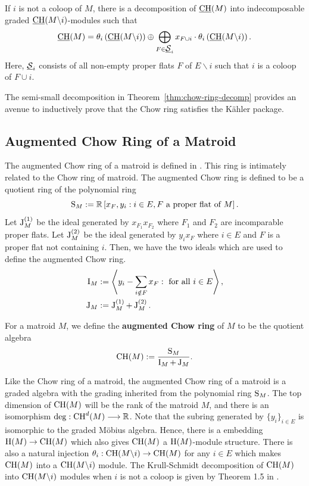 \documentclass{puthesis-UG}
\begin{document}
\begin{thm}  \label{thm:chow-ring-decomp}
	If $i$ is not a coloop of $M$, there is a decomposition of $\underbar{$\operatorname{CH}$}(M)$ into indecomposable graded $\underbar{$\operatorname{CH}$}(M \backslash i)$-modules such that 
	\[
		\underbar{$\operatorname{CH}$}(M) = \theta_i \left ( \underbar{$\operatorname{CH}$} (M \backslash i) \right ) \oplus \bigoplus_{F \in \underbar{$\mathcal{S}$}_i} x_{F \cup i} \cdot \theta_i \left ( \underbar{$\operatorname{CH}$} (M \backslash i) \right ).
	\]
	Here, $\underbar{$\mathcal{S}$}_i$ consists of all non-empty proper flats $F$ of $E \backslash i$ such that $i$ is a coloop of $F \cup i$. 
\end{thm}

The semi-small decomposition in Theorem~\ref{thm:chow-ring-decomp} provides an avenue to inductively prove that the Chow ring satisfies the K\"ahler package. 

\subsection{Augmented Chow Ring of a Matroid}

The augmented Chow ring of a matroid is defined in \cite{huh-semi-small}. This ring is intimately related to the Chow ring of matroid. The augmented Chow ring is defined to be a quotient ring of the polynomial ring
\[
	\operatorname{S}_M := \mathbb{R} \left [x_F, y_i : i \in E, F \text{ a proper flat of } M \right ].
\]
Let $\operatorname{J}_M^{(1)}$ be the ideal generated by $x_{F_1} x_{F_2}$ where $F_1$ and $F_2$ are incomparable proper flats. Let $\operatorname{J}_M^{(2)}$ be the ideal generated by $y_i x_F$ where $i \in E$ and $F$ is a proper flat not containing $i$. Then, we have the two ideals which are used to define the augmented Chow ring. 
\begin{align*}
	\operatorname{I}_M & := \left \langle y_i - \sum_{i \notin F} x_F : \text{ for all } i \in E \right \rangle,\\
	\operatorname{J}_M & := \operatorname{J}_M^{(1)} + \operatorname{J}_M^{(2)}.
\end{align*}

\begin{defn} \label{def:augmented-chow-ring-of-matroid}
	For a matroid $M$, we define the \textbf{augmented Chow ring} of $M$ to be the quotient algebra
	\[
		\operatorname{CH}(M) := \frac{\operatorname{S}_M}{\operatorname{I}_M + \operatorname{J}_M}.
	\]
\end{defn}
Like the Chow ring of a matroid, the augmented Chow ring of a matroid is a graded algebra with the grading inherited from the polynomial ring $\operatorname{S}_M$. The top dimension of $\operatorname{CH}(M)$ will be the rank of the matroid $M$, and there is an isomorphism $\deg : \operatorname{CH}^d(M) \longrightarrow \mathbb{R}$. Note that the subring generated by $\{y_i\}_{i \in E}$ is isomorphic to the graded M\"obius algebra. Hence, there is a embedding $\operatorname{H}(M) \to \operatorname{CH}(M)$ which also gives $\operatorname{CH}(M)$ a $\operatorname{H}(M)$-module structure. There is also a natural injection $\theta_i : \operatorname{CH}(M \backslash i) \to \operatorname{CH}(M)$ for any $i \in E$ which makes $\operatorname{CH}(M)$ into a $\operatorname{CH}(M \backslash i)$ module. The Krull-Schmidt decomposition of $\operatorname{CH}(M)$ into $\operatorname{CH}(M \backslash i)$ modules when $i$ is not a coloop is given by Theorem 1.5 in \cite{huh-semi-small}.
\end{document}
